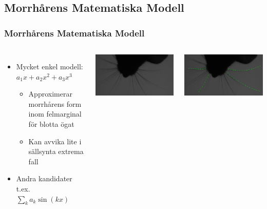 \documentclass[]{beamer}
\renewcommand{\ae}{\"{a}}
\renewcommand{\oe}{\"{o}}
\begin{document}
\subsection{Morrh\aa rens Matematiska Modell}
\begin{frame}
  \frametitle{Morrh\aa rens Matematiska Modell}

  \begin{columns}[c]
    \column{3in}
    \begin{itemize}
    \item Mycket enkel modell: $a_1x + a_2x^2 + a_3x^3$
      \begin{itemize}
      \item Approximerar morrh\aa rens form inom felmarginal f\oe r blotta \oe gat
      \item Kan avvika lite i s\ae llsynta extrema fall
      \end{itemize}
    \item Andra kandidater t.ex. $\sum\limits_k a_k\sin \left(kx\right)$
    \end{itemize}
    
    \column{1.5in}
    \includegraphics[width=1\textwidth]{rat-vanilla.png}

    \includegraphics[width=1\textwidth]{rat-splines.png}
  \end{columns}
\end{frame}
\end{document}

